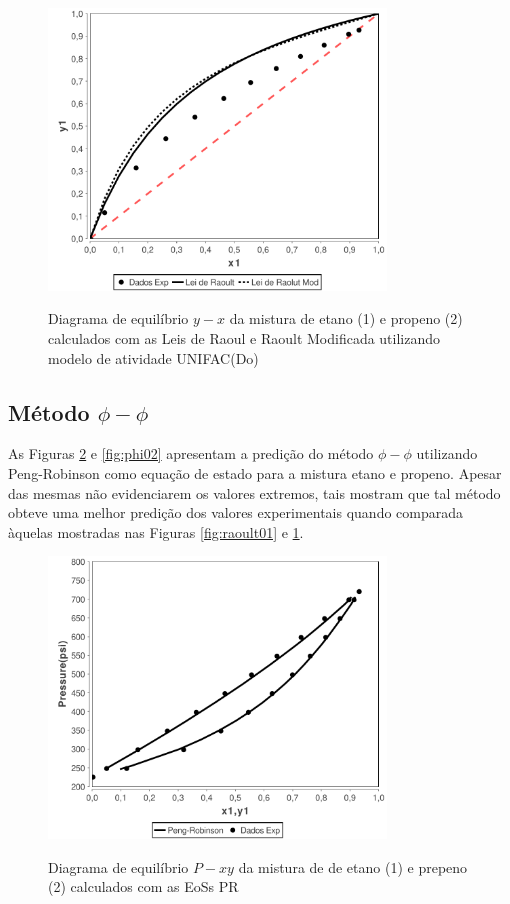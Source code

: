 \begin{figure}[htb]
\centering
{\includegraphics[width=0.8\textwidth]{img/VLE-Ethane(1)Propylene(2)-x1&y1-Raoult-RaoultMod.pdf}}
\caption{Diagrama de equilíbrio $y-x$ da mistura de etano (1) e
propeno (2) calculados com as Leis de Raoul e Raoult Modificada utilizando
modelo de atividade UNIFAC(Do)}
\label{fig:raoult02}
\end{figure} 


\subsection{Método $\phi-\phi$} 

As Figuras \ref{fig:phi01} e \ref{fig:phi02} apresentam a predição do método
$\phi-\phi$ utilizando Peng-Robinson como equação de estado para a mistura
etano e propeno. Apesar das mesmas não evidenciarem os valores
extremos, tais mostram que tal método obteve uma melhor predição dos valores
experimentais quando comparada àquelas mostradas nas Figuras
\ref{fig:raoult01} e \ref{fig:raoult02}.

\begin{figure}
\centering
{\includegraphics[width=0.8\textwidth]{img/VLE-Ethane(1)Propylene(2)-x1y1&Pressure-PengRobinson.pdf}}
\caption{Diagrama de equilíbrio $P-xy$ da mistura de de etano (1) e
prepeno (2) calculados com as EoSs PR}
\label{fig:phi01}
\end{figure}

